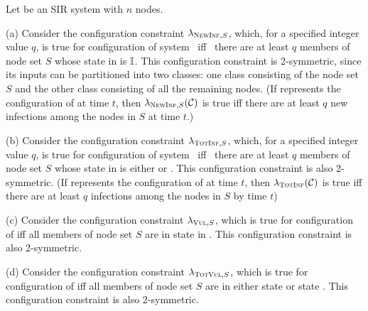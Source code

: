 \begin{example}\label{ex:r_symm}
Let \cals{} be an SIR system with $n$ nodes.
\begin{description}
\item{(a)} 
Consider the configuration constraint $\lambda_{\textsc{NewInf},S}$,
which, for a specified integer value $q$,
is true for configuration \calc{} of system \cals{} ~iff~
there are at least $q$ members of node set $S$ whose state in \calc{} is $\mbox{$\mathbb{I}$}$.
This configuration constraint is 2-symmetric,
since its inputs can be partitioned into two classes: one class consisting of 
the node set $S$ and the other class consisting of all the remaining nodes.
(If \calc{} represents the configuration of \cals{} at time $t$,
then $\lambda_{\textsc{NewInf},S}(\mbox{${\cal C}$})$ is true iff there are at least 
$q$ new infections among the nodes in $S$ at time $t$.)

\item{(b)} 
Consider the configuration constraint $\lambda_{\textsc{TotInf},S}$,
which, for a specified integer value $q$,
is true for configuration \calc{} of system \cals{} ~iff~
there are at least $q$ members of node set $S$ 
whose state in \calc{} is either \istate{} or \rstate{}.
This configuration constraint is also 2-symmetric.
(If \calc{} represents the configuration of \cals{} at time $t$,
then $\lambda_{\textsc{TotInf}}(\mbox{${\cal C}$})$ 
is true iff there are at least $q$ infections among the nodes in $S$ by time $t$)

\item{(c)} 
Consider the configuration constraint $\lambda_{\textsc{Vul},S}$,
which is true for configuration \calc{} of \cals{} iff
all members of node set $S$ are in state \istate{} in \calc{}.
This configuration constraint is also 2-symmetric.

\item{(d)} 
Consider the configuration constraint $\lambda_{\textsc{TotVul},S}$,
which is true for configuration \calc{} of \cals{} iff 
all members of node set $S$ are in either state \istate{} or state \rstate{}.
This configuration constraint is also 2-symmetric.


\end{description}
\end{example}
